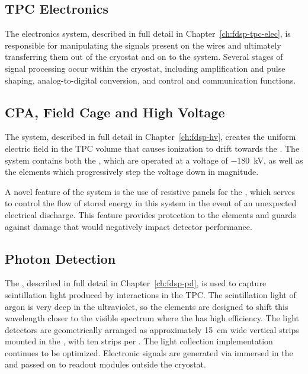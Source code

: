 \subsection{TPC Electronics}
\label{sec:fdsp-ov-elec}

The electronics system, described in full detail in Chapter~\ref{ch:fdsp-tpc-elec}, is responsible for manipulating the signals present on the  wires and ultimately transferring them out of the cryostat and on to the  system.  %
Several stages of signal processing occur within the cryostat, including  amplification and pulse shaping, analog-to-digital conversion, and control and communication functions.



\subsection{CPA, Field Cage and High Voltage}
\label{sec:fdsp-ov-hv}

The  system, described in full detail in Chapter~\ref{ch:fdsp-hv}, creates the uniform electric field in the TPC volume that causes ionization to drift towards the .  The  system contains both the , which are operated at a 
voltage of \SI{-180}{kV}, as well as the  elements which progressively step the  voltage down in magnitude.  

A novel feature of the %
{} system is the use of resistive panels for the , which serves to control the flow of stored energy in this system in the event of an unexpected electrical discharge.  This feature provides protection to the  elements and guards against damage that would negatively impact detector performance.  


\subsection{Photon Detection}
\label{sec:fdsp-ov-pds}

The , described in full detail in Chapter~\ref{ch:fdsp-pd}, is used to capture scintillation light produced by interactions in the TPC.  The scintillation light of argon is very deep in the ultraviolet, so the  elements are designed to shift this wavelength closer to the visible spectrum where the  has high efficiency.   
The  light detectors are geometrically arranged as approximately \SI{15}{cm} wide vertical strips mounted in the , with ten strips per .  The light collection implementation continues to be optimized.  Electronic signals are generated via  immersed in the \lar and passed on to readout modules outside the cryostat.

